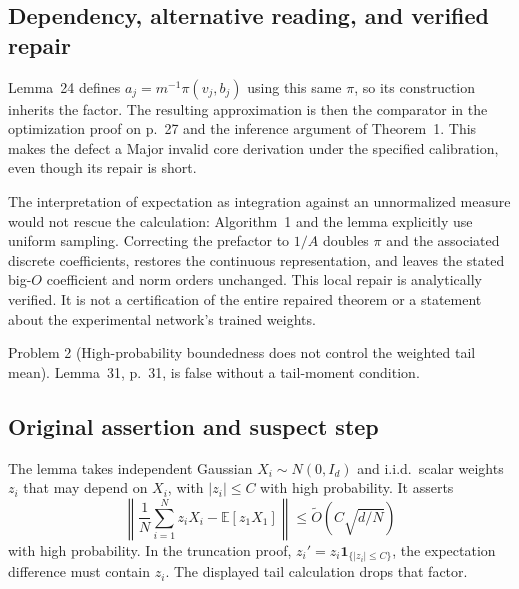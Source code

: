 \documentclass[10pt]{article}
\begin{document}
\subsection*{Dependency, alternative reading, and verified repair}
Lemma 24 defines \(a_j=m^{-1}\pi(v_j,b_j)\) using this same \(\pi\), so its construction inherits the factor. The resulting approximation is then the comparator in the optimization proof on p. 27 and the inference argument of Theorem 1. This makes the defect a Major invalid core derivation under the specified calibration, even though its repair is short.\par
The interpretation of expectation as integration against an unnormalized measure would not rescue the calculation: Algorithm 1 and the lemma explicitly use uniform sampling. Correcting the prefactor to \(1/A\) doubles \(\pi\) and the associated discrete coefficients, restores the continuous representation, and leaves the stated big-\(O\) coefficient and norm orders unchanged. This local repair is analytically verified. It is not a certification of the entire repaired theorem or a statement about the experimental network’s trained weights.\par
Problem 2 (High-probability boundedness does not control the weighted tail mean).  Lemma 31, p. 31, is false without a tail-moment condition.\par
\subsection*{Original assertion and suspect step}
The lemma takes independent Gaussian \(X_i\sim N(0,I_d)\) and i.i.d. scalar weights \(z_i\) that may depend on \(X_i\), with \(|z_i|\le C\) with high probability. It asserts \[\left\|\frac1N\sum_{i=1}^N z_iX_i-\mathbb E[z_1X_1]\right\|
 \le \widetilde O(C\sqrt{d/N})\] with high probability. In the truncation proof, \(z_i'=z_i\mathbf1_{\{|z_i|\le C\}}\), the expectation difference must contain \(z_i\). The displayed tail calculation drops that factor.\par
\end{document}
